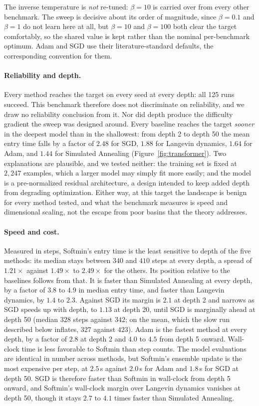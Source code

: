 \documentclass{article} %
\theoremstyle{plain}
\theoremstyle{definition}
\theoremstyle{remark}
\begin{document}
The inverse temperature is \emph{not} re-tuned: $\beta=10$ is carried over from every other
benchmark. The sweep is decisive about its order of magnitude, since $\beta=0.1$ and $\beta=1$ do
not learn here at all, but $\beta=10$ and $\beta=100$ both clear the target comfortably, so the
shared value is kept rather than the nominal per-benchmark optimum. Adam and SGD use their
literature-standard defaults, the corresponding convention for them.

\paragraph{Reliability and depth.} Every method reaches the target on every seed at every depth: all 125 runs succeed.
This benchmark therefore does not discriminate on
reliability, and we draw no reliability conclusion from it. Nor did depth produce the difficulty
gradient the sweep was designed around. Every baseline reaches the target \emph{sooner} in the
deepest model than in the shallowest: from depth 2 to depth 50 the mean entry time falls by a
factor of $2.48$ for SGD, $1.88$ for Langevin dynamics, $1.64$ for Adam, and $1.44$ for Simulated
Annealing (Figure~\ref{fig:transformer}). Two explanations are plausible, and we tested
neither: the training set is fixed at $2{,}247$ examples, which a larger model may simply fit more
easily; and the model is a pre-normalized residual architecture, a design intended to keep added
depth from degrading optimization. Either way, at this target the landscape is benign for every
method tested, and what the benchmark measures is speed and dimensional scaling, not the escape
from poor basins that the theory addresses.

\paragraph{Speed and cost.} Measured in steps, Softmin's entry time is the least sensitive to depth of the five methods: its
median stays between $340$ and $410$ steps at every depth, a spread of $1.21\times$ against
$1.49\times$ to $2.49\times$ for the others. Its position relative to the baselines follows from
that. It is faster than Simulated Annealing at every depth, by a factor of $3.8$ to $4.9$ in
median entry time, and faster than Langevin dynamics, by $1.4$ to $2.3$. Against SGD its margin
is $2.1$ at depth 2 and narrows as SGD speeds up with depth, to $1.13$ at depth 20, until SGD is
marginally ahead at depth 50 (median $328$ steps against $342$; on the mean, which the slow run
described below inflates, $327$ against $423$). Adam is the fastest method at every depth, by a
factor of $2.8$ at depth 2 and $4.0$ to $4.5$ from depth 5 onward. Wall-clock time is less
favorable to Softmin than step counts. The model evaluations are identical in number across
methods, but Softmin's ensemble update is the most expensive per step, at $2.5$\,s against
$2.0$\,s for Adam and $1.8$\,s for SGD at depth 50. SGD is therefore faster than Softmin in
wall-clock from depth 5 onward, and Softmin's wall-clock margin over Langevin dynamics vanishes at
depth 50, though it stays $2.7$ to $4.1$ times faster than Simulated Annealing.
\end{document}
